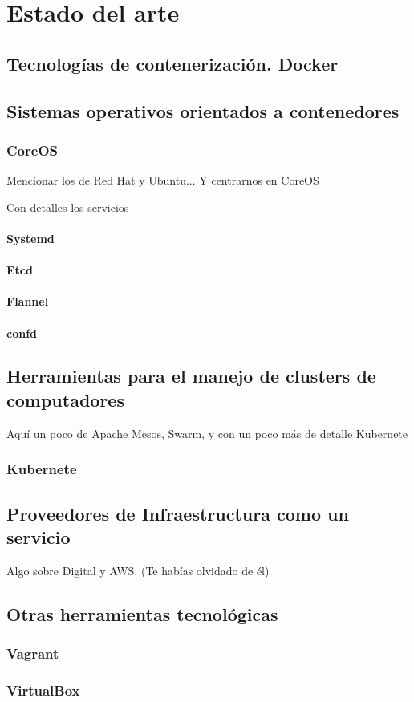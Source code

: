 \chapter{Estado del arte}
\label{cha:state_of_art}


\section{Tecnologías de contenerización. Docker}

\section{Sistemas operativos orientados a contenedores}

\subsection{CoreOS}

 Mencionar los de Red Hat y Ubuntu...
Y centrarnos en CoreOS


Con detalles los servicios

\subsubsection{Systemd}
\subsubsection{Etcd}
\subsubsection{Flannel}

\subsubsection{confd}

\section{Herramientas para el manejo de clusters de computadores}
Aquí un poco de Apache Mesos, Swarm, y con un poco más de detalle Kubernete

\subsection{Kubernete}

\section{Proveedores de Infraestructura como un servicio}

Algo sobre Digital y AWS. (Te habías olvidado de él)

\section{Otras herramientas tecnológicas}

\subsection{Vagrant}

\subsection{VirtualBox}
